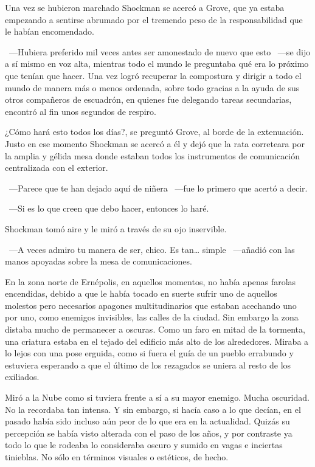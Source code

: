 Una vez se hubieron marchado Shockman se acercó a Grove, que ya estaba empezando a sentirse abrumado por el tremendo peso de la responsabilidad que le habían encomendado.

~---Hubiera preferido mil veces antes ser amonestado de nuevo que esto ~---se dijo a sí mismo en voz alta, mientras todo el mundo le preguntaba qué era lo próximo que tenían que hacer. Una vez logró recuperar la compostura y dirigir a todo el mundo de manera más o menos ordenada, sobre todo gracias a la ayuda de sus otros compañeros de escuadrón, en quienes fue delegando tareas secundarias, encontró al fin unos segundos de respiro.

¿Cómo hará esto todos los días?, se preguntó Grove, al borde de la extenuación. Justo en ese momento Shockman se acercó a él y dejó que la rata correteara por la amplia y gélida mesa donde estaban todos los instrumentos de comunicación centralizada con el exterior.

~---Parece que te han dejado aquí de niñera ~---fue lo primero que acertó a decir.

~---Si es lo que creen que debo hacer, entonces lo haré.

Shockman tomó aire y le miró a través de su ojo inservible.

~---A veces admiro tu manera de ser, chico. Es tan… simple ~---añadió con las manos apoyadas sobre la mesa de comunicaciones.

\parbreak
En la zona norte de Ernépolis, en aquellos momentos, no había apenas farolas encendidas, debido a que le había tocado en suerte sufrir uno de aquellos molestos pero necesarios apagones multitudinarios que estaban acechando uno por uno, como enemigos invisibles, las calles de la ciudad. Sin embargo la zona distaba mucho de permanecer a oscuras. Como un faro en mitad de la tormenta, una criatura estaba en el tejado del edificio más alto de los alrededores. Miraba a lo lejos con una pose erguida, como si fuera el guía de un pueblo errabundo y estuviera esperando a que el último de los rezagados se uniera al resto de los exiliados.

Miró a la Nube como si tuviera frente a sí a su mayor enemigo. Mucha oscuridad. No la recordaba tan intensa. Y sin embargo, si hacía caso a lo que decían, en el pasado había sido incluso aún peor de lo que era en la actualidad. Quizás su percepción se había visto alterada con el paso de los años, y por contraste ya todo lo que le rodeaba lo consideraba oscuro y sumido en vagas e inciertas tinieblas. No sólo en términos visuales o estéticos, de hecho.

